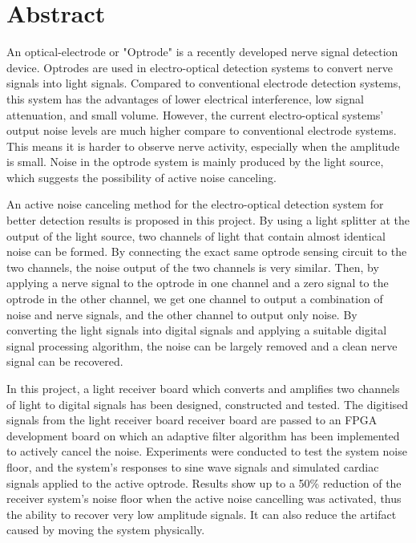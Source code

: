 \chapter{Abstract}



An optical-electrode or "Optrode" is a recently developed nerve signal detection device. Optrodes are used in electro-optical detection systems to convert nerve signals into light signals. Compared to conventional electrode detection systems, this system has the advantages of lower electrical interference, low signal attenuation, and small volume. However, the current electro-optical systems' output noise levels are much higher compare to conventional electrode systems. This means it is harder to observe nerve activity, especially when the amplitude is small. Noise in the optrode system is mainly produced by the light source, which suggests the possibility of active noise canceling.

An active noise canceling method for the electro-optical detection system for better detection results is proposed in this project. By using a light splitter at the output of the light source, two channels of light that contain almost identical noise can be formed. By connecting the exact same optrode sensing circuit to the two channels, the noise output of the two channels is very similar. Then, by applying a nerve signal to the optrode in one channel and a zero signal to the optrode in the other channel, we get one channel to output a combination of noise and nerve signals, and the other channel to output only noise. By converting the light signals into digital signals and applying a suitable digital signal processing algorithm, the noise can be largely removed and a clean nerve signal can be recovered.

In this project, a light receiver board which converts and amplifies two channels of light to digital signals has been designed, constructed and tested.  The digitised signals from the light receiver board receiver board are passed to an FPGA development board on which an adaptive filter algorithm has been implemented to actively cancel the noise. Experiments were conducted to test the system noise floor, and the system's responses to sine wave signals and simulated cardiac signals applied to the active optrode. Results show up to a 50\% reduction of the receiver system's noise floor when the active noise cancelling was activated, thus the ability to recover very low amplitude signals.  It can also reduce the artifact caused by moving the system physically.

